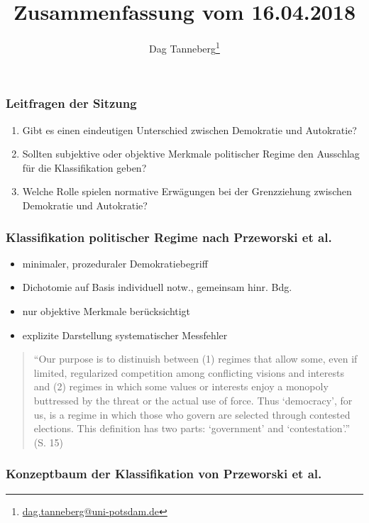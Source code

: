 \documentclass{beamer}
\title{Zusammenfassung vom 16.04.2018}
\author{Dag Tanneberg\thanks{%
  \href{mailto:dag.tanneberg@uni-potsdam.de}%
    {dag.tanneberg@uni-potsdam.de}
  }
}
\institute[Universität Potsdam]{
  {\glqq}Wie erkl\"art man autorit\"are Herrschaft?{\grqq}\\
  Universität Potsdam\\
  Lehrstuhl für Vergleichende Politikwissenschaft\\
  Sommersemester 2018
}
\begin{document}
\maketitle

\begin{frame}
  \frametitle{Leitfragen der Sitzung}
  \begin{enumerate}
    \item Gibt es einen eindeutigen Unterschied zwischen
      Demokratie und Autokratie?
    \item Sollten subjektive oder objektive Merkmale
      politischer Regime den Ausschlag für die Klassifikation
      geben?
    \item Welche Rolle spielen normative Erwägungen bei der
      Grenzziehung zwischen Demokratie und Autokratie?
  \end{enumerate}
\end{frame}

\begin{frame}
  \frametitle{Klassifikation politischer Regime nach Przeworski et al.}
  \begin{itemize}
    \item minimaler, prozeduraler Demokratiebegriff
    \item Dichotomie auf Basis individuell notw., gemeinsam hinr. Bdg.
    \item nur objektive Merkmale berücksichtigt
    \item explizite Darstellung systematischer Messfehler
  \end{itemize}

  \begin{quote}
    \normalfont
    \small
    ``Our purpose is to distinuish between (1) regimes that
    allow some, even if limited, regularized competition
    among conflicting visions and interests and (2) regimes
    in which some values or interests enjoy a monopoly
    buttressed by the threat or the actual use of force.
    Thus `democracy', for us, is a regime in which those who
    govern are selected through contested elections. This
    definition has two parts: `government' and
    `contestation'.'' (S. 15)
  \end{quote}
\end{frame}

\begin{frame}
  \frametitle{Konzeptbaum der Klassifikation von Przeworski et al.}
  \begin{figure}[t]
    
  \end{figure}
\end{frame}
\end{document}
